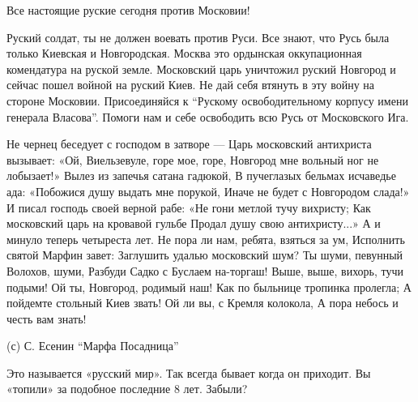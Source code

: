 \begin{itemize}
Все настоящие руские сегодня против Московии!

Руский солдат, ты не должен воевать против Руси. Все знают, что Русь была
только Киевская и Новгородская. Москва это ордынская оккупационная комендатура
на руской земле. Московский царь уничтожил руский Новгород и сейчас пошел
войной на руский Киев. Не дай себя втянуть в эту войну на стороне Московии.
Присоединяйся к \enquote{Рускому освободительному корпусу имени генерала
Власова}.  Помоги нам и себе освободить всю Русь от Московского Ига.

\raggedcolumns
\begin{multicols}{2} %
\setlength{\parindent}{0pt}
\obeycr
Не чернец беседует с господом в затворе —
Царь московский антихриста вызывает:
«Ой, Виельзевуле, горе мое, горе,
Новгород мне вольный ног не лобызает!»
\smallskip
Вылез из запечья сатана гадюкой,
В пучеглазых бельмах исчаведье ада:
«Побожися душу выдать мне порукой,
Иначе не будет с Новгородом слада!»
\smallskip
И писал господь своей верной рабе:
«Не гони метлой тучу вихристу;
Как московский царь на кровавой гульбе
Продал душу свою антихристу...»
\smallskip
А и минуло теперь четыреста лет.
Не пора ли нам, ребята, взяться за ум,
Исполнить святой Марфин завет:
Заглушить удалью московский шум?
\smallskip
Ты шуми, певунный Волохов, шуми,
Разбуди Садко с Буслаем на-торгаш!
Выше, выше, вихорь, тучи подыми!
Ой ты, Новгород, родимый наш!
\smallskip
Как по быльнице тропинка пролегла;
А пойдемте стольный Киев звать!
Ой ли вы, с Кремля колокола,
А пора небось и честь вам знать!
\restorecr
\end{multicols} %

(с) С. Есенин \enquote{Марфа Посадница}


Это называется «русский мир». Так всегда бывает когда он приходит. Вы «топили»
за подобное последние 8 лет. Забыли?

\end{itemize} %
